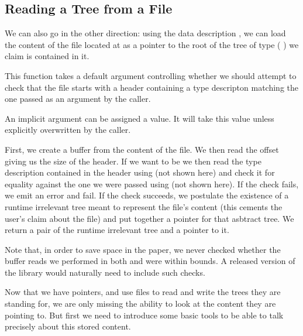 \subsection{Reading a Tree from a File}

We can also go in the other direction: using the data description
, we can load the content of the file located at
 as a pointer to the root of the tree of type
( ) we claim is contained in it.


This function takes a default argument  controlling
whether we should attempt to check that the file starts with a header
containing a type descripton matching the one passed as an argument
by the caller.

\begin{remark}
  An implicit argument can be assigned a  value.
  It will take this value unless explicitly overwritten by the caller.
\end{remark}

First, we create a buffer from the content of the file.
We then read the offset giving us the size of the header.
If we want to be  we then read the type description
contained in the header using  (not shown here)
and check it for equality against the one we were passed using 
(not shown here).
%
If the check fails, we emit an error and fail.
%
If the check succeeds, we postulate the existence of a runtime irrelevant
tree meant to represent the file's content (this cements the user's claim
about the file) and put together a pointer for that asbtract tree.
%
We return a pair of the runtime irrelevant tree and a pointer to it.

Note that, in order to save space in the paper, we never checked whether
the buffer reads we performed in both  and
 were within bounds.
%
A released version of the library would naturally need to include such
checks.


Now that we have pointers,
and use files to read and write the trees they are standing for,
we are only missing the ability to look at the content they are pointing to.
%
But first we need to introduce some basic tools
to be able to talk precisely about this stored content.
